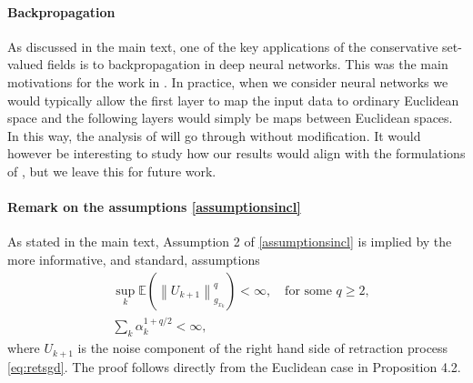 \documentclass{article}
\newcommand{\BR}{\mathbb{R}}
\newcommand{\BN}{\mathbb{N}}
\newcommand{\norm}[1]{\left\lVert#1\right\rVert}
\begin{document}


\paragraph{Backpropagation}
As discussed in the main text, one of the key applications of the conservative set-valued fields is to backpropagation in deep neural networks. This was the main motivations for the work in \cite{bolte2021conservative}. In practice, when we consider neural networks we would typically allow the first layer to map the input data to ordinary Euclidean space and the following layers would simply be maps between Euclidean spaces. In this way, the analysis of \cite{bolte2021conservative} will go through without modification. It would however be interesting to study how our results would align with the formulations of \cite{hauser2017principles}, but we leave this for future work. 




\paragraph{Remark on the assumptions \ref{assumptionsincl}}
As stated in the main text, Assumption 2 of \ref{assumptionsincl} is implied by the more informative, and standard, assumptions
\begin{equation}
    \begin{aligned}
        &\sup_k\mathbb{E}(\norm{U_{k+1}}_{g_{x_k}}^q)<\infty,\quad \text{for some } q\geq 2,\\
        &\sum_k\alpha_k^{1+q/2}<\infty,
    \end{aligned}
\end{equation}
where $U_{k+1}$ is the noise component of the right hand side of retraction process \eqref{eq:retsgd}. The proof follows directly from the Euclidean case in \cite{benaim2006dynamics} Proposition 4.2. 
\end{document}
